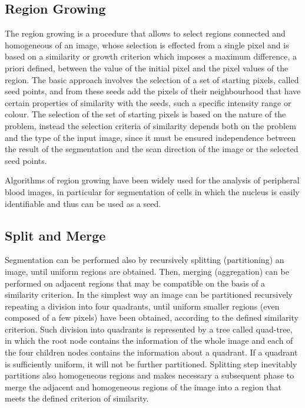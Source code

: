 \documentclass[final,a4paper,12pt,english]{UnicaPhdThesis3}
\begin{document}
	\subsection{Region Growing} %
	The region growing is a procedure that allows to select regions connected and homogeneous of an image, whose selection is effected from a single pixel and is based on a similarity or growth criterion which imposes a maximum difference, a priori defined, between the value of the initial pixel and the pixel values ​​of the region. The basic approach involves the selection of a set of starting pixels, called seed points, and from these seeds add the pixels of their neighbourhood that have certain properties of similarity with the seeds, such a specific intensity range or colour. The selection of the set of starting pixels is based on the nature of the problem, instead the selection criteria of similarity depends both on the problem and the type of the input image, since it must be ensured independence between the result of the segmentation and the scan direction of the image or the selected seed points. 
	
	Algorithms of region growing have been widely used for the analysis of peripheral blood images, in particular for segmentation of cells in which the nucleus is easily identifiable and thus can be used as a seed. 
	
	\subsection{Split and Merge} %
	Segmentation can be performed also by recursively splitting (partitioning) an image, until uniform regions are obtained. Then, merging (aggregation) can be performed on adjacent regions that may be compatible on the basis of a similarity criterion. In the simplest way an image can be partitioned recursively repeating a division into four quadrants, until uniform smaller regions (even composed of a few pixels) have been obtained, according to the defined similarity criterion. Such division into quadrants is represented by a tree called quad-tree, in which the root node contains the information of the whole image and each of the four children nodes contains the information about a quadrant. If a quadrant is sufficiently uniform, it will not be further partitioned. Splitting step inevitably partitions also homogeneous regions and makes necessary a subsequent phase to merge the adjacent and homogeneous regions of the image into a region that meets the defined criterion of similarity.
	
\end{document}
